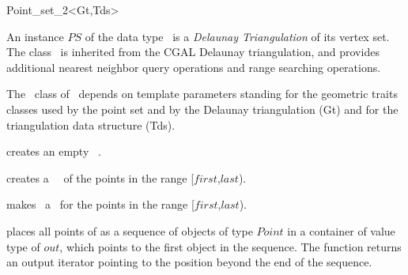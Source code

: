 \begin{ccRefClass}{Point_set_2<Gt,Tds>}

\ccDefinition


An instance $PS$ of the data type \ccRefName\  is a {\em Delaunay Triangulation}
of its vertex set. The class \ccRefName\ is inherited from the CGAL Delaunay triangulation,
and provides additional nearest neighbor query operations and range searching operations.

The \ccRefName\ class of \cgal\ depends on template parameters standing for the
geometric traits classes used by the point set and by the Delaunay triangulation (Gt)
and for the triangulation data structure (Tds). 




\ccHtmlLinksOff


\ccTypes
{}
\ccThreeToTwo
{}

\ccHtmlLinksOn


\ccCreation

{creates an empty \ccRefName\ .}


{creates a \ccRefName\ \ccVar\ of the points in the range
[$first$,$last$).}


\ccOperations


{ makes \ccVar\ a \ccRefName\ for the points in the range
[$first$,$last$).}

{ places all points of \ccVar as a sequence of objects of type
$Point$ in a container of value type of  $out$,
which points to the first object in the sequence. The function
returns an output iterator pointing to the position beyond the end
of the sequence.} 


\end{ccRefClass}
